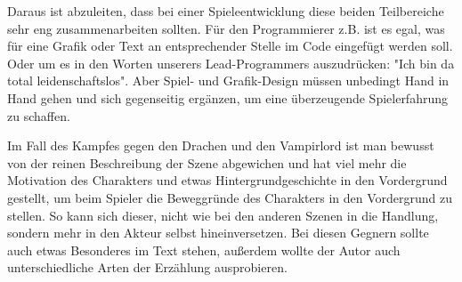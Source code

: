 Daraus ist abzuleiten, dass bei einer Spieleentwicklung diese beiden Teilbereiche sehr eng zusammenarbeiten sollten. Für den Programmierer z.B. ist es egal, was für eine Grafik oder Text an entsprechender Stelle im Code eingefügt werden soll. Oder um es in den Worten unserers Lead-Programmers auszudrücken: "Ich bin da total leidenschaftslos". Aber Spiel- und Grafik-Design müssen unbedingt Hand in Hand gehen und sich gegenseitig ergänzen, um eine überzeugende Spielerfahrung zu schaffen. 

Im Fall des Kampfes gegen den Drachen und den Vampirlord ist man bewusst von der reinen Beschreibung der Szene abgewichen und hat viel mehr die Motivation des Charakters und etwas Hintergrundgeschichte in den Vordergrund gestellt, um beim Spieler die Beweggründe des Charakters in den Vordergrund zu stellen. So kann sich dieser, nicht wie bei den anderen Szenen in die Handlung, sondern mehr in den Akteur selbst hineinversetzen. Bei diesen Gegnern sollte auch etwas Besonderes im Text stehen, außerdem wollte der Autor auch unterschiedliche Arten der Erzählung ausprobieren.
